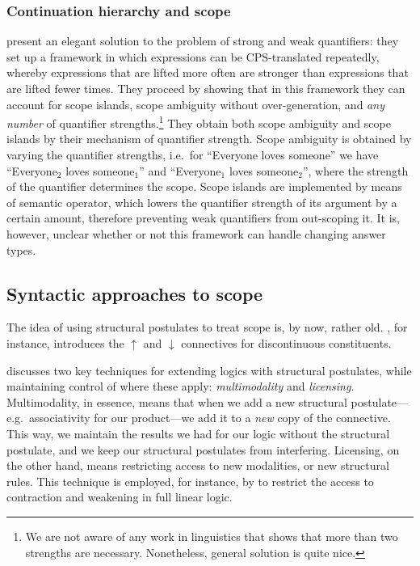 \subsubsection{Continuation hierarchy and scope}
\citet{kiselyov2014} present an elegant solution to the problem of
strong and weak quantifiers: they set up a framework in which
expressions can be CPS-translated repeatedly, whereby expressions that
are lifted more often are stronger than expressions that are lifted
fewer times. They proceed by showing that in this framework they can
account for scope islands, scope ambiguity without over-generation,
and \emph{any number} of quantifier strengths.\footnote{%
  We are not aware of any work in linguistics that shows that more
  than two strengths are necessary. Nonetheless,
   general solution is quite nice.
}
They obtain both scope ambiguity and scope islands by their mechanism
of quantifier strength. Scope ambiguity is obtained by varying the
quantifier strengths, i.e.\ for ``Everyone loves someone'' we have
``Everyone$_2$ loves someone$_1$'' and  ``Everyone$_1$ loves
someone$_2$'', where the strength of the quantifier determines the
scope. Scope islands are implemented by means of semantic operator,
which lowers the quantifier strength of its argument by a certain
amount, therefore preventing weak quantifiers from out-scoping it.
It is, however, unclear whether or not this framework can handle
changing answer types.



\subsection{Syntactic approaches to scope}
\label{sec:syntactic-approaches-to-scope}
The idea of using structural postulates to treat scope is, by now,
rather old. \citet{morrill1994}, for instance, introduces the
$\uparrow$ and $\downarrow$ connectives for discontinuous
constituents.

\citet{moortgat1996} discusses two key techniques for extending
logics with structural postulates, while maintaining control of where
these apply: \emph{multimodality} and \emph{licensing}.
Multimodality, in essence, means that when we add a new structural
postulate---e.g.\ associativity for our product---we add it to a
\emph{new} copy of the connective. This way, we maintain the results
we had for our logic without the structural postulate, and we keep our
structural postulates from interfering.
Licensing, on the other hand, means restricting access to new
modalities, or new structural rules. This technique is employed, for
instance, by \citet{girard1987} to restrict the access to contraction
and weakening in full linear logic.

